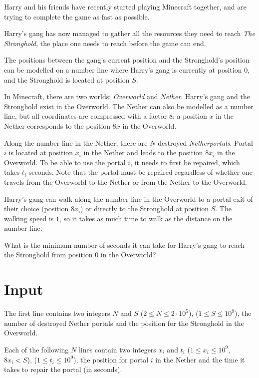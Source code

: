 \noindent


Harry and his friends have recently started playing Minecraft together, and are trying to complete the game as fast as possible.

Harry's gang has now managed to gather all the resources they need to reach \textit{The Stronghold}, the place one needs to reach before the game can end.

The positions between the gang's current position and the Stronghold's position can be modelled on a number line where Harry's gang is currently at position $0$, and the Stronghold is located at position $S$.

In Minecraft, there are two worlds: \textit{Overworld} and \textit{Nether}. Harry's gang and the Stronghold exist in the Overworld.
The Nether can also be modelled as a number line, but all coordinates are compressed with a factor $8$: 
a position $x$ in the Nether corresponds to the position $8x$ in the Overworld.

Along the number line in the Nether, there are $N$ destroyed \textit{Netherportals}. 
Portal $i$ is located at position $x_i$ in the Nether and leads to the position $8x_i$ in the Overworld.
To be able to use the portal $i$, it needs to first be repaired, which takes $t_i$ seconds. 
Note that the portal must be repaired regardless of whether one travels from the Overworld to the Nether or from the Nether to the Overworld.

Harry's gang can walk along the number line in the Overworld to a portal exit of their choice (position $8x_i$) or directly
to the Stronghold at position $S$. 
The walking speed is $1$, so it takes as much time to walk as the distance on the number line.

What is the minimum number of seconds it can take for Harry's gang to reach the Stronghold from position $0$ in the Overworld? 

\section*{Input}
The first line contains two integers $N$ and $S$ ($2 \le N \le 2 \cdot 10^5$), ($1 \le S \le 10^9$), the number of destroyed Nether portals and the position for the Stronghold in the Overworld.

Each of the following $N$ lines contain two integers $x_i$ and $t_i$ ($1 \le x_i \le 10^9$, $8x_i < S$), ($1 \le t_i \le 10^9$), the position for portal $i$ in the Nether and the time it takes to repair the portal (in seconds).


